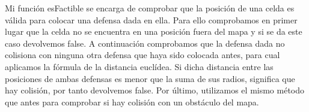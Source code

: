 Mi función esFactible se encarga de comprobar que la posición de una celda es válida para colocar una defensa dada en ella. Para ello comprobamos en primer lugar que la celda no se encuentra en una posición fuera del mapa y si se da este caso devolvemos false.
A continuación comprobamos que la defensa dada no colisiona con ninguna otra defensa que haya sido colocada antes, para cual aplicamos la fórmula de la distancia euclídea. Si dicha distancia entre las posiciones de ambas defensas es menor que la suma de sus radios, significa que hay colisión, por tanto devolvemos false. 
Por último, utilizamos el mismo método que antes para comprobar si hay colisión con un obstáculo del mapa.